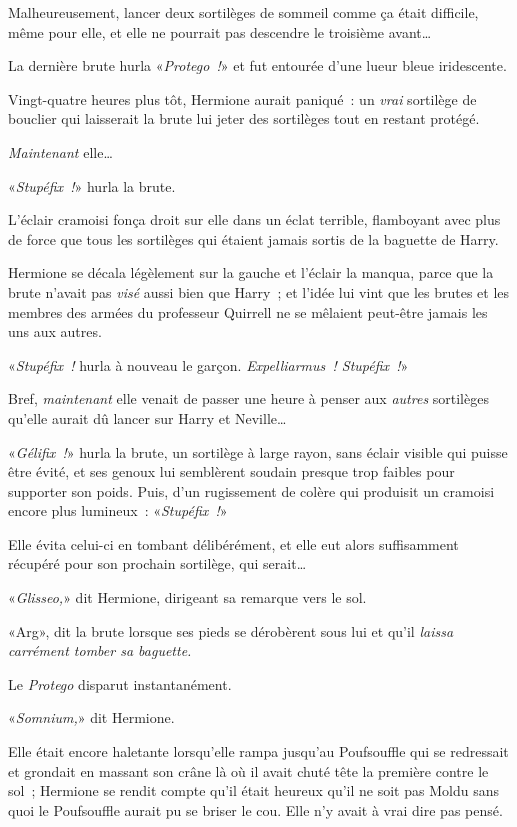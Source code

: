 Malheureusement, lancer deux sortilèges de sommeil comme ça était difficile, même pour elle, et elle ne pourrait pas descendre le troisième avant…

La dernière brute hurla «\emph{Protego~!}» et fut entourée d'une lueur bleue iridescente.

Vingt-quatre heures plus tôt, Hermione aurait paniqué~: un \emph{vrai} sortilège de bouclier qui laisserait la brute lui jeter des sortilèges tout en restant protégé.

\emph{Maintenant} elle…

«\emph{Stupéfix~!}» hurla la brute.

L'éclair cramoisi fonça droit sur elle dans un éclat terrible, flamboyant avec plus de force que tous les sortilèges qui étaient jamais sortis de la baguette de Harry.

Hermione se décala légèlement sur la gauche et l'éclair la manqua, parce que la brute n’avait pas \emph{visé} aussi bien que Harry~; et l'idée lui vint que les brutes et les membres des armées du professeur Quirrell ne se mêlaient peut-être jamais les uns aux autres.

«\emph{Stupéfix~!} hurla à nouveau le garçon. \emph{Expelliarmus~! Stupéfix~!}»

Bref, \emph{maintenant} elle venait de passer une heure à penser aux \emph{autres} sortilèges qu'elle aurait dû lancer sur Harry et Neville…

«\emph{Gélifix~!}» hurla la brute, un sortilège à large rayon, sans éclair visible qui puisse être évité, et ses genoux lui semblèrent soudain presque trop faibles pour supporter son poids. Puis, d'un rugissement de colère qui produisit un cramoisi encore plus lumineux~: «\emph{Stupéfix~!}»

Elle évita celui-ci en tombant délibérément, et elle eut alors suffisamment récupéré pour son prochain sortilège, qui serait…

«\emph{Glisseo,}» dit Hermione, dirigeant sa remarque vers le sol.

«Arg», dit la brute lorsque ses pieds se dérobèrent sous lui et qu'il \emph{laissa carrément tomber sa baguette.}

Le \emph{Protego} disparut instantanément.

«\emph{Somnium,}» dit Hermione.

Elle était encore haletante lorsqu'elle rampa jusqu'au Poufsouffle qui se redressait et grondait en massant son crâne là où il avait chuté tête la première contre le sol~; Hermione se rendit compte qu'il était heureux qu'il ne soit pas Moldu sans quoi le Poufsouffle aurait pu se briser le cou. Elle n'y avait à vrai dire pas pensé.

